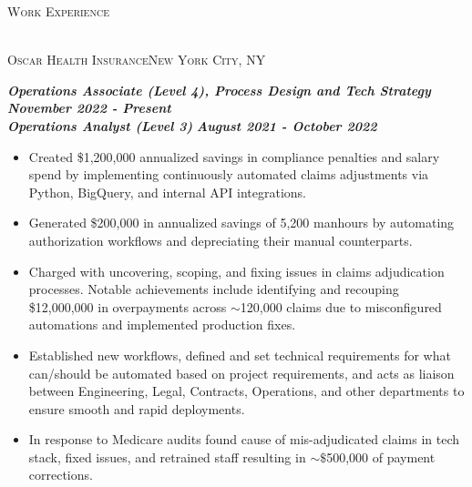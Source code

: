 \documentclass[a4paper]{article}
\newcommand{\lineunder} {
    \vspace*{-8pt} \\
    \hspace*{-18pt} \hrulefill \\
}
\newcommand{\header} [1] {
    {\hspace*{-18pt}\vspace*{6pt} \textsc{#1}}
    \vspace*{-6pt} \lineunder
}
\newcommand{\jobtitle} [1] {
    {\hspace*{-18pt} \textsc{#1}}

}
\begin{document}
\header{Work Experience}
\vspace{1mm}
\jobtitle{Oscar Health Insurance\hfill New York City, NY}
\hspace*{-16pt}\textit{\textbf{Operations Associate (Level 4), Process Design and Tech Strategy}} \hfill \textit{\textbf{November 2022 - Present}}\\
\hspace*{-16pt}\textit{\textbf{Operations Analyst (Level 3)}} \hfill \textit{\textbf{August 2021 - October 2022}}\\
\vspace{-1mm}
\begin{itemize}[leftmargin=10pt,align=left]

    \vspace{-1.5mm} \item
            Created \$1,200,000 annualized savings in compliance penalties and salary spend by implementing continuously automated claims adjustments
            via Python, BigQuery, and internal API integrations.

    \vspace{-1.5mm} \item
            Generated \$200,000 in annualized savings of 5,200 manhours by automating authorization workflows and depreciating their manual counterparts.

    \vspace{-1.5mm} \item
            Charged with uncovering, scoping, and fixing issues in claims adjudication processes.
            Notable achievements include identifying and recouping \$12,000,000 in overpayments across
            $\sim$120,000 claims due to misconfigured automations and implemented production fixes.

    \vspace{-1.5mm} \item
        Established new workflows, defined and set technical requirements for what can/should be automated based on project requirements,
        and acts as liaison between Engineering, Legal, Contracts, Operations, and other departments to ensure smooth and rapid deployments.

    \vspace{-1.5mm} \item
        In response to Medicare audits found cause of mis-adjudicated claims in tech stack, fixed issues, and retrained staff
        resulting in $\sim\$$500,000 of payment corrections.


\end{itemize}
\end{document}
